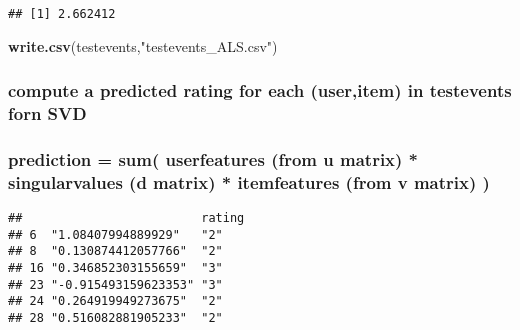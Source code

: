 \documentclass[]{article}
\newenvironment{Shaded}{\begin{snugshade}}{\end{snugshade}}
\newcommand{\CommentTok}[1]{\textcolor[rgb]{0.56,0.35,0.01}{\textit{#1}}}
\newcommand{\ControlFlowTok}[1]{\textcolor[rgb]{0.13,0.29,0.53}{\textbf{#1}}}
\newcommand{\DecValTok}[1]{\textcolor[rgb]{0.00,0.00,0.81}{#1}}
\newcommand{\KeywordTok}[1]{\textcolor[rgb]{0.13,0.29,0.53}{\textbf{#1}}}
\newcommand{\NormalTok}[1]{#1}
\newcommand{\OperatorTok}[1]{\textcolor[rgb]{0.81,0.36,0.00}{\textbf{#1}}}
\newcommand{\StringTok}[1]{\textcolor[rgb]{0.31,0.60,0.02}{#1}}
\begin{document}
\begin{verbatim}
## [1] 2.662412
\end{verbatim}

\begin{Shaded}
\begin{Highlighting}[]
\KeywordTok{write.csv}\NormalTok{(testevents,}\StringTok{"testevents_ALS.csv"}\NormalTok{)}
\end{Highlighting}
\end{Shaded}

\hypertarget{compute-a-predicted-rating-for-each-useritem-in-testevents-forn-svd}{%
\subsubsection{compute a predicted rating for each (user,item) in
testevents forn
SVD}\label{compute-a-predicted-rating-for-each-useritem-in-testevents-forn-svd}}

\hypertarget{prediction-sum-userfeatures-from-u-matrix-singularvalues-d-matrix-itemfeatures-from-v-matrix-1}{%
\subsubsection{prediction = sum( userfeatures (from u matrix) *
singularvalues (d matrix) * itemfeatures (from v matrix)
)}\label{prediction-sum-userfeatures-from-u-matrix-singularvalues-d-matrix-itemfeatures-from-v-matrix-1}}

\begin{Shaded}
\end{Shaded}

\begin{verbatim}
##                         rating
## 6  "1.08407994889929"   "2"   
## 8  "0.130874412057766"  "2"   
## 16 "0.346852303155659"  "3"   
## 23 "-0.915493159623353" "3"   
## 24 "0.264919949273675"  "2"   
## 28 "0.516082881905233"  "2"
\end{verbatim}
\end{document}
